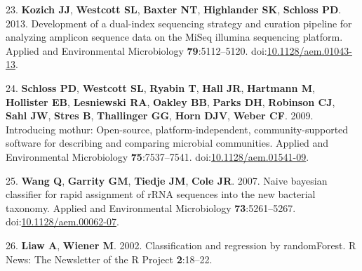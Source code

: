 \documentclass[11pt,]{article}
\begin{document}
\hypertarget{ref-Kozich2013}{}
23. \textbf{Kozich JJ}, \textbf{Westcott SL}, \textbf{Baxter NT},
\textbf{Highlander SK}, \textbf{Schloss PD}. 2013. Development of a
dual-index sequencing strategy and curation pipeline for analyzing
amplicon sequence data on the MiSeq illumina sequencing platform.
Applied and Environmental Microbiology \textbf{79}:5112--5120.
doi:\href{https://doi.org/10.1128/aem.01043-13}{10.1128/aem.01043-13}.

\hypertarget{ref-Schloss2009}{}
24. \textbf{Schloss PD}, \textbf{Westcott SL}, \textbf{Ryabin T},
\textbf{Hall JR}, \textbf{Hartmann M}, \textbf{Hollister EB},
\textbf{Lesniewski RA}, \textbf{Oakley BB}, \textbf{Parks DH},
\textbf{Robinson CJ}, \textbf{Sahl JW}, \textbf{Stres B},
\textbf{Thallinger GG}, \textbf{Horn DJV}, \textbf{Weber CF}. 2009.
Introducing mothur: Open-source, platform-independent,
community-supported software for describing and comparing microbial
communities. Applied and Environmental Microbiology
\textbf{75}:7537--7541.
doi:\href{https://doi.org/10.1128/aem.01541-09}{10.1128/aem.01541-09}.

\hypertarget{ref-Wang2007}{}
25. \textbf{Wang Q}, \textbf{Garrity GM}, \textbf{Tiedje JM},
\textbf{Cole JR}. 2007. Naive bayesian classifier for rapid assignment
of rRNA sequences into the new bacterial taxonomy. Applied and
Environmental Microbiology \textbf{73}:5261--5267.
doi:\href{https://doi.org/10.1128/aem.00062-07}{10.1128/aem.00062-07}.

\hypertarget{ref-Liaw2002}{}
26. \textbf{Liaw A}, \textbf{Wiener M}. 2002. Classification and
regression by randomForest. R News: The Newsletter of the R Project
\textbf{2}:18--22.
\end{document}
